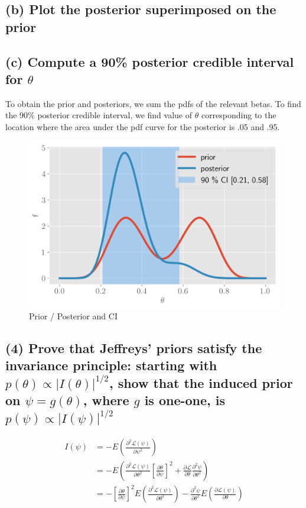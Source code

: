 \documentclass[11pt]{article}
\begin{document}
\subsection*{(b) Plot the posterior superimposed on the prior}
\subsection*{(c) Compute a 90\% posterior credible interval for $\theta$}

To obtain the prior and posteriors, we sum the pdfs of the relevant betas. To find the 90\% posterior credible interval, we find value of $\theta$ corresponding to the location where the area under the pdf curve for the posterior is .05 and .95. 

\begin{figure}[!h]
    \centering
    \includegraphics[scale=.6
    ]{homework_3/figures/binom.png}
    \caption{Prior / Posterior and CI}
    \label{fig:my_label}
\end{figure}

\subsection*{(4) Prove that Jeffreys’ priors satisfy the invariance principle: starting with $p(\theta) \propto |I(\theta)|^{1/2}$, show that the induced prior on $\psi = g(\theta)$, where $g$ is one-one, is
$p(\psi) \propto |I(\psi)|^{1/2}$}


\begin{align*}
    I(\psi) &= -E\left(\frac{\partial ^2\mathcal{L}(\psi)}{\partial \psi^2}\right)\\
    &= -E\left(\frac{\partial^2\mathcal{L}(\psi)}{\partial \theta^2} \left[\frac{\partial \theta}{\partial \psi}\right]^2 + \frac{\partial \mathcal{L}}{\partial \theta} \frac{\partial ^2\psi}{\partial \theta^2}\right)\\
     &= -\left[\frac{\partial \theta}{\partial \psi}\right]^2E\left(\frac{\partial^2\mathcal{L}(\psi)}{\partial \theta^2}\right)  -\frac{\partial ^2\psi}{\partial \theta^2}E\left(\frac{\partial \mathcal{L}(\psi)}{\partial \theta} \right)
\end{align*}
\end{document}
